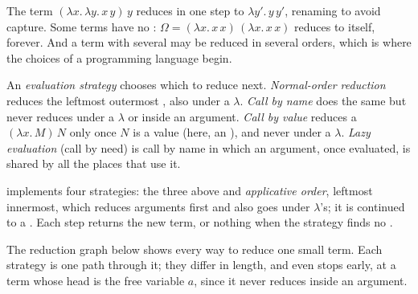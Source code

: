 The term $(\lambda x.\,\lambda y.\,x\,y)\,y$ reduces in one step to $\lambda y'.\,y\,y'$, renaming to avoid capture. Some terms have no : $\Omega = (\lambda x.\,x\,x)\,(\lambda x.\,x\,x)$ reduces to itself, forever. And a term with several  may be reduced in several orders, which is where the choices of a programming language begin.

\begin{definition}\label{def:b3:lambda-calculus:strategy}
An \emph{evaluation strategy} chooses which  to reduce next. \emph{Normal-order reduction} reduces the leftmost outermost , also under a $\lambda$. \emph{Call by name} does the same but never reduces under a $\lambda$ or inside an argument. \emph{Call by value} reduces a  $(\lambda x.\,M)\,N$ only once $N$ is a value (here, an ), and never under a $\lambda$. \emph{Lazy evaluation} (call by need) is call by name in which an argument, once evaluated, is shared by all the places that use it.
\end{definition}

 implements four strategies: the three above and \emph{applicative order}, leftmost innermost, which reduces arguments first and also goes under $\lambda$'s; it is  continued to a . Each step returns the new term, or nothing when the strategy finds no .

\label{lst:b3:lambda-calculus:step}

The reduction graph below shows every way to reduce one small term. Each strategy is one path through it; they differ in length, and  even stops early, at a term whose head is the free variable $a$, since it never reduces inside an argument.

